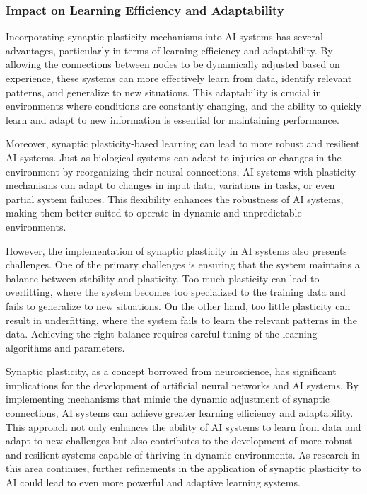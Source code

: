 \documentclass[12pt,twoside]{article}
\begin{document}
\subsubsection{Impact on Learning Efficiency and Adaptability}

Incorporating synaptic plasticity mechanisms into AI systems has several advantages, particularly in terms of learning efficiency and adaptability. By allowing the connections between nodes to be dynamically adjusted based on experience, these systems can more effectively learn from data, identify relevant patterns, and generalize to new situations. This adaptability is crucial in environments where conditions are constantly changing, and the ability to quickly learn and adapt to new information is essential for maintaining performance.

Moreover, synaptic plasticity-based learning can lead to more robust and resilient AI systems. Just as biological systems can adapt to injuries or changes in the environment by reorganizing their neural connections, AI systems with plasticity mechanisms can adapt to changes in input data, variations in tasks, or even partial system failures. This flexibility enhances the robustness of AI systems, making them better suited to operate in dynamic and unpredictable environments.

However, the implementation of synaptic plasticity in AI systems also presents challenges. One of the primary challenges is ensuring that the system maintains a balance between stability and plasticity. Too much plasticity can lead to overfitting, where the system becomes too specialized to the training data and fails to generalize to new situations. On the other hand, too little plasticity can result in underfitting, where the system fails to learn the relevant patterns in the data. Achieving the right balance requires careful tuning of the learning algorithms and parameters.

Synaptic plasticity, as a concept borrowed from neuroscience, has significant implications for the development of artificial neural networks and AI systems. By implementing mechanisms that mimic the dynamic adjustment of synaptic connections, AI systems can achieve greater learning efficiency and adaptability. This approach not only enhances the ability of AI systems to learn from data and adapt to new challenges but also contributes to the development of more robust and resilient systems capable of thriving in dynamic environments. As research in this area continues, further refinements in the application of synaptic plasticity to AI could lead to even more powerful and adaptive learning systems.
\end{document}

